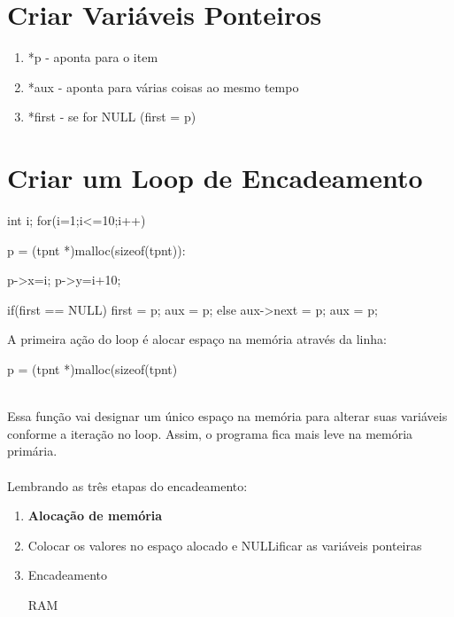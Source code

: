 \documentclass[ ]{article}
\begin{document}
\section{Criar Variáveis Ponteiros}
\begin{minipage}{8 cm}
	\begin{mylist}
int(main){
	tpnt *p;
	tpnt *aux;
	tpnt *first = NULL;
	\end{mylist}
\end{minipage}
\begin{minipage}{8 cm}
	\begin{enumerate}
		\item *p - aponta para o item
		\item *aux - aponta para várias coisas ao mesmo tempo
		\item *first - se for NULL (first = p)
	\end{enumerate}
\end{minipage}

\section{Criar um Loop de Encadeamento}
	\begin{mylist}
	int i;
	for(i=1;i<=10;i++){
		p = (tpnt *)malloc(sizeof(tpnt)):

		p->x=i;
		p->y=i+10;
		
		if(first == NULL){
			first = p;
			aux = p;
		}
		else{
			aux->next = p;
			aux = p;
		}
	}
		
	\end{mylist}
	A primeira ação do loop é alocar espaço na memória através da linha:\begin{mylist}		p = (tpnt *)malloc(sizeof(tpnt)\end{mylist}\\
	Essa função vai designar um único espaço na memória para alterar suas variáveis conforme a iteração no loop. Assim, o programa fica mais leve na memória primária.\\
	\\
	Lembrando as três etapas do encadeamento:
	\begin{enumerate}
	\item \textbf{Alocação de memória}
	\item Colocar os valores no espaço alocado e NULLificar as variáveis ponteiras
	\item Encadeamento \vspace{1 cm} \\
	\begin{huge}
	RAM
	\end{huge}
	\end{enumerate}
	
	\\
\end{document}

